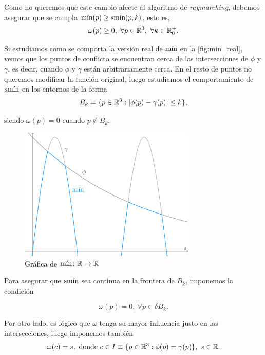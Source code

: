 Como no queremos que este cambio afecte al algoritmo de \textit{raymarching}, debemos asegurar que se cumpla $\Min(p)\ge \smin(p,k)$, esto es,
\begin{equation*}
\omega(p)\ge 0,\ \forall p\in \R^3,\ \forall k\in \R^+_0.
\end{equation*}

Si estudiamos como se comporta la versión real de $\Min$ en la \autoref{fig:min_real}, vemos que los puntos de conflicto se encuentran cerca de las intersecciones de $\phi$ y $\gamma$, es decir, cuando $\phi$ y $\gamma$ están arbitrariamente cerca. En el resto de puntos no queremos modificar la función original, luego estudiamos el comportamiento de $\smin$ en los entornos de la forma
\begin{equation*}
    B_{k} = \{p\in\R^3 : |\phi(p)-\gamma(p)| \le k\},
\end{equation*}

siendo $\omega(p) = 0$ cuando $p\notin B_{k}$.\newline

\begin{figure}[t]
    \centering
    \includegraphics[width=0.75\textwidth]{Plantilla-TFG-master/img/smooth_real.png}
    \caption{Gráfica de $\Min\colon \R\to\R$}
    \label{fig:min_real}
\end{figure}

Para asegurar que $\smin$ sea continua en la frontera de $B_{k}$, imponemos la condición 

\begin{equation*}
    \omega(p) = 0,\ \forall p \in \delta B_{k}.
\end{equation*}

Por otro lado, es lógico que $\omega$ tenga su mayor influencia justo en las intersecciones, luego imponemos también 
\begin{equation*}
    \omega(c) = s, \text{ donde } c \in I \equiv \{p\in\R^3 : \phi(p) = \gamma(p)\},\ s\in \R.
\end{equation*}

